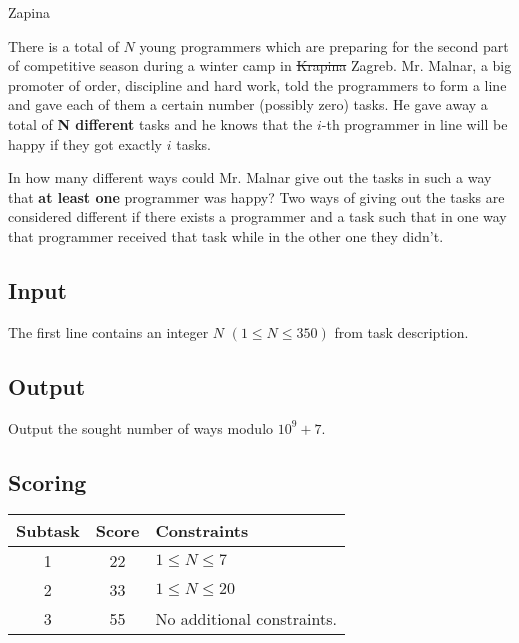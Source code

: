 \begin{statement}[
  problempoints=110,
  timelimit=1 second,
  memorylimit=512 MiB,
]{Zapina}

There is a total of $N$ young programmers which are preparing for the second
part of competitive season during a winter camp in \sout {Krapina} Zagreb.
Mr. Malnar, a big promoter of order, discipline and hard work, told the
programmers to form a line and gave each of them a certain number (possibly zero)
tasks. He gave away a total of \textbf{N different} tasks and he knows that the
$i$-th programmer in line will be happy if they got exactly $i$ tasks.

In how many different ways could Mr. Malnar give out the tasks in such a way
that \textbf{at least one} programmer was happy? Two ways of giving out the
tasks are considered different if there exists a programmer and a task such that
in one way that programmer received that task while in the other one they
didn't.

\subsection*{Input}
The first line contains an integer $N$ $(1 \le N \le 350)$ from task
description.

\subsection*{Output}
Output the sought number of ways modulo $10^9+7$.

 \subsection*{Scoring}
{\renewcommand{\arraystretch}{1.4}
  \setlength{\tabcolsep}{6pt}
  \begin{tabular}{ccl}
 Subtask & Score & Constraints \\ \midrule
  1 & 22 & $1 \le N \le 7$ \\
  2 & 33 & $1 \le N \le 20$ \\
  3 & 55 & No additional constraints.
\end{tabular}}


\end{statement}
